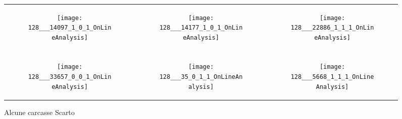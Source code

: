 \begin{figure}[ht] %
  \begin{center}
    \begin{tabular}{ccc}

  \begin{subfigure}{.3\linewidth}
    \centering\texttt{[image: 128\_\_\_14097\_1\_0\_1\_OnLineAnalysis]}
    \caption{}
  \end{subfigure} &

  \begin{subfigure}{.3\linewidth}
      \texttt{[image: 128\_\_\_14177\_1\_0\_1\_OnLineAnalysis]}
      \caption{}
      \label{fig:esempi_scarti_sbaffo}
    \end{subfigure} &

  \begin{subfigure}{.3\linewidth}
      \texttt{[image: 128\_\_\_22886\_1\_1\_1\_OnLineAnalysis]}
      \caption{}
    \end{subfigure} \\ \\

  \begin{subfigure}{.3\linewidth}
      \texttt{[image: 128\_\_\_33657\_0\_0\_1\_OnLineAnalysis]}
      \caption{}
      \label{fig:esempi_scarti_goccia}
    \end{subfigure} &

  \begin{subfigure}{.3\linewidth}
      \texttt{[image: 128\_\_\_35\_0\_1\_1\_OnLineAnalysis]}
      \caption{}
    \end{subfigure} &

    \begin{subfigure}{.3\linewidth}
      \texttt{[image: 128\_\_\_5668\_1\_1\_1\_OnLineAnalysis]}
      \caption{}
    \end{subfigure} \\

    \end{tabular}
    \caption{Alcune carcasse Scarto}
    \label{fig:esempi_scarti}
  \end{center}
\end{figure}

